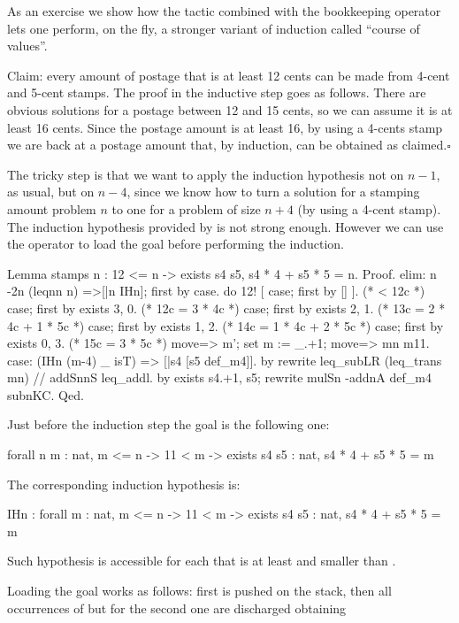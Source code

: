 As an exercise we show how the  tactic combined with the bookkeeping
operator \C{:} lets one perform, on the fly, a stronger variant of
induction called ``course of values''.

Claim: every amount of postage that is at least 12 cents
can be made from 4-cent and 5-cent stamps.  The proof in the inductive
step goes as follows.  There are obvious solutions for a postage between
12 and 15 cents, so we can assume it is at least 16 cents.  Since
the postage amount is at least 16, by using a 4-cents stamp we are back
at a postage amount that, by induction, can be obtained as claimed.\hfill$\square$

The tricky step is that we want to apply the induction hypothesis not
on $n-1$, as usual, but on $n-4$, since we know how to turn a
solution for a stamping amount problem $n$ to one for a problem of
size $n+4$ (by using a 4-cent stamp).  
The induction hypothesis provided by 
is not strong enough.  However we can use the \C{:} operator
to load the goal before performing the induction.

\begin{coq}{}{}
Lemma stamps n : 12 <= n -> exists s4 s5, s4 * 4 + s5 * 5 = n.
Proof.
elim: n {-2}n (leqnn n) =>[|n IHn]; first by case.
do 12! [ case; first by [] ]. (* < 12c *)
case; first by exists 3, 0.   (* 12c = 3 * 4c *)
case; first by exists 2, 1.   (* 13c = 2 * 4c + 1 * 5c *)
case; first by exists 1, 2.   (* 14c = 1 * 4c + 2 * 5c *)
case; first by exists 0, 3.   (* 15c = 3 * 5c *)
move=> m'; set m := _.+1; move=> mn m11.
case: (IHn (m-4) _ isT) => [|s4 [s5 def_m4]].
  by rewrite leq_subLR (leq_trans mn) // addSnnS leq_addl.
by exists s4.+1, s5; rewrite mulSn -addnA def_m4 subnKC.
Qed.
\end{coq}

Just before the induction step the goal is the following one:

\begin{coq}{}{}
forall n m : nat,
  m <= n -> 11 < m -> exists s4 s5 : nat, s4 * 4 + s5 * 5 = m	
\end{coq}
The corresponding induction hypothesis  is:

\begin{coq}{}{}
IHn : forall m : nat,
      m <= n ->
      11 < m -> exists s4 s5 : nat, s4 * 4 + s5 * 5 = m
\end{coq}
Such hypothesis is accessible for each  that is at least 
and smaller than .

Loading the goal works as follows: first  is pushed on
the stack, then all occurrences of  but for the second one are
discharged obtaining

